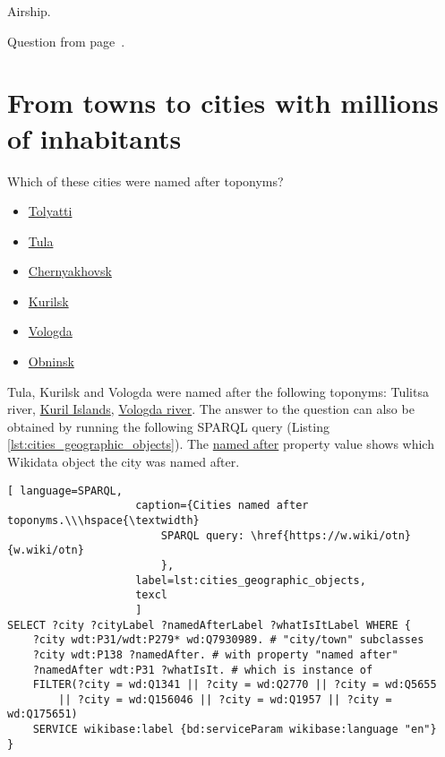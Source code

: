 Airship. 

Question from page~\pageref{question:aircraft_question_4}.






\section{From towns to cities with millions of inhabitants}

\begin{exercise}%
    \label{answer:cities_geographic_objects}
Which of these cities were named after toponyms?
\begin{itemize}
\item \href{https://w.wiki/pzi}{Tolyatti}
\item \href{https://w.wiki/pzj}{Tula}
\item \href{https://w.wiki/pzk}{Chernyakhovsk}
\item \href{https://w.wiki/pzm}{Kurilsk}
\item \href{https://w.wiki/pzn}{Vologda}
\item \href{https://w.wiki/pzo}{Obninsk}
\end{itemize}
\end{exercise}

Tula, Kurilsk and Vologda were named after the following toponyms: Tulitsa river, \href{https://w.wiki/qqJ}{Kuril Islands}, \href{https://w.wiki/qqK}{Vologda river}. The answer to the question can also be obtained by running the following SPARQL query (Listing \ref{lst:cities_geographic_objects}). The \href{https://www.wikidata.org/wiki/Property:P138}{named after} property value shows which Wikidata object the city was named after.
    
\begin{lstlisting}[ language=SPARQL, 
                    caption={Cities named after toponyms.\\\hspace{\textwidth}
                        SPARQL query: \href{https://w.wiki/otn}{w.wiki/otn}
                        },
                    label=lst:cities_geographic_objects,
                    texcl 
                    ]
SELECT ?city ?cityLabel ?namedAfterLabel ?whatIsItLabel WHERE {
	?city wdt:P31/wdt:P279* wd:Q7930989. # "city/town" subclasses
	?city wdt:P138 ?namedAfter. # with property "named after"
	?namedAfter wdt:P31 ?whatIsIt. # which is instance of
	FILTER(?city = wd:Q1341 || ?city = wd:Q2770 || ?city = wd:Q5655 
		|| ?city = wd:Q156046 || ?city = wd:Q1957 || ?city = wd:Q175651)
	SERVICE wikibase:label {bd:serviceParam wikibase:language "en"}
}
\end{lstlisting}%

